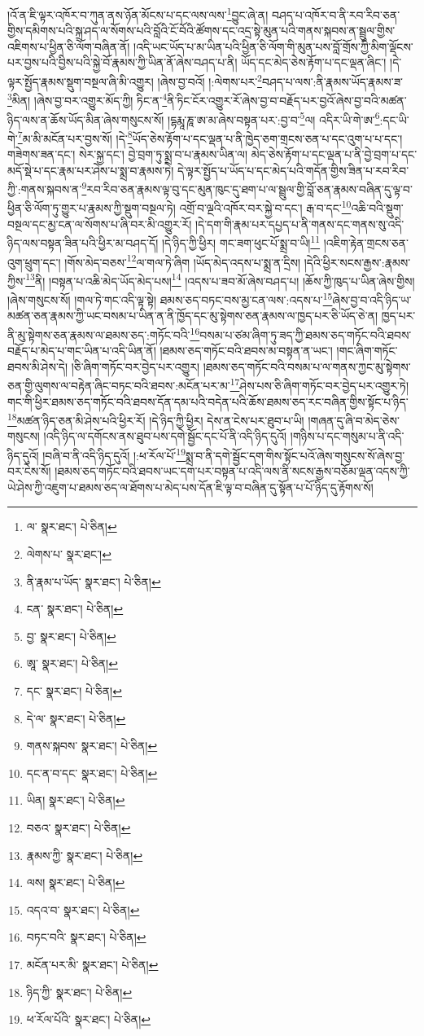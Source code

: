 །འོ་ན་ཇི་ལྟར་འཁོར་བ་ཀུན་ནས་ཉོན་མོངས་པ་དང་ལས་ལས་\footnote{ལ་  སྣར་ཐང་།  པེ་ཅིན། }བྱུང་ཞེ་ན། བཤད་པ་འཁོར་བ་ནི་རབ་རིབ་ཅན་གྱིས་དམིགས་པའི་སྐྲ་ཤད་ལ་སོགས་པའི་བློའི་ངོ་བོའི་ཚོགས་དང་འདྲ་སྟེ་མུན་པའི་གནས་སྐབས་ན་སྦྲུལ་གྱིས་འཇིགས་པ་ཕྱིན་ཅི་ལོག་བཞིན་ནོ། །འདི་ཡང་ཡོད་པ་མ་ཡིན་པའི་ཕྱིན་ཅི་ལོག་གི་མུན་པས་བློ་གྲོས་ཀྱི་མིག་ལྡོངས་པར་བྱས་པའི་བྱིས་པའི་སྐྱེ་བོ་རྣམས་ཀྱི་ཡིན་ནོ་ཞེས་བཤད་པ་ནི། ཡོད་དང་མེད་ཅེས་རྟོག་པ་དང་ལྡན་ཞིང་། །དེ་ལྟར་སྤྱོད་རྣམས་སྡུག་བསྔལ་ཞི་མི་འགྱུར། །ཞེས་བྱ་བའོ། །:ལེགས་པར་\footnote{ལེགས་པ་  སྣར་ཐང་། }བཤད་པ་ལས་:ནི་རྣམས་ཡོད་རྣམས་ཟ་\footnote{ནི་རྣམ་པ་ཡོད་  སྣར་ཐང་།  པེ་ཅིན། }མིན། །ཞེས་བྱ་བར་འགྱུར་མོད་ཀྱི། ཏིང་ན་\footnote{ངན་  སྣར་ཐང་།  པེ་ཅིན། }ནི་ཏིང་ངོར་འགྱུར་རོ་ཞེས་བྱ་བ་བརྗོད་པར་བྱའོ་ཞེས་བྱ་བའི་མཚན་ཉིད་ལས་ན་ཆོས་ཡོད་མིན་ཞེས་གསུངས་སོ། །དྷརྨཱ་ཎཱ་ཨ་མ་ཞེས་བསྟན་པར་:བྱ་བ་\footnote{བྱ་  སྣར་ཐང་།  པེ་ཅིན། }ལ། འདིར་ཡི་གེ་ཨ་\footnote{ཨཱ་  སྣར་ཐང་།  པེ་ཅིན། }:དང་ཡི་གེ་\footnote{དང་  སྣར་ཐང་།  པེ་ཅིན། }མ་མི་མངོན་པར་བྱས་སོ། །དེ་\footnote{དེ་ལ་  སྣར་ཐང་།  པེ་ཅིན། }ཡོད་ཅེས་རྟོག་པ་དང་ལྡན་པ་ནི་ཁྱེད་ཅག་གྲངས་ཅན་པ་དང་འུག་པ་པ་དང་། གཟེགས་ཟན་དང་། སེར་སྐྱ་དང་། བྱེ་བྲག་ཏུ་སྨྲ་བ་པ་རྣམས་ཡིན་ལ། མེད་ཅེས་རྟོག་པ་དང་ལྡན་པ་ནི་བྱེ་བྲག་པ་དང་མདོ་སྡེ་པ་དང་རྣམ་པར་ཤེས་པ་སྨྲ་བ་རྣམས་ཏེ། དེ་ལྟར་སྤྱོད་པ་ཡོད་པ་དང་མེད་པའི་གདོན་གྱིས་ཟིན་པ་རབ་རིབ་ཀྱི་:གནས་སྐབས་ན་\footnote{གནས་སྐབས་  སྣར་ཐང་།  པེ་ཅིན། }རབ་རིབ་ཅན་རྣམས་ལྟ་བུ་དང་མུན་ཁུང་དུ་ཐག་པ་ལ་སྦྲུལ་གྱི་བློ་ཅན་རྣམས་བཞིན་དུ་ལྟ་བ་ཕྱིན་ཅི་ལོག་ཏུ་གྱུར་པ་རྣམས་ཀྱི་སྡུག་བསྔལ་ཏེ། འགྲོ་བ་ལྔའི་འཁོར་བར་སྐྱེ་བ་དང་། རྒ་བ་དང་\footnote{དང་ན་བ་དང་  སྣར་ཐང་།  པེ་ཅིན། }འཆི་བའི་སྡུག་བསྔལ་དང་མྱ་ངན་ལ་སོགས་པ་ཞི་བར་མི་འགྱུར་རོ། །དེ་དག་གི་རྣམ་པར་དཔྱད་པ་ནི་གནས་དང་གནས་སུ་འདི་ཉིད་ལས་བསྟན་ཟིན་པའི་ཕྱིར་མ་བཤད་དོ། །དེ་ཉིད་ཀྱི་ཕྱིར། གང་ཟག་ཕུང་པོ་སྨྲ་བ་ཡི།\footnote{ཡིན།  སྣར་ཐང་།  པེ་ཅིན། } །འཇིག་རྟེན་གྲངས་ཅན་འུག་ཕྲུག་དང་། །གོས་མེད་བཅས་\footnote{བཅའ་  སྣར་ཐང་།  པེ་ཅིན། }ལ་གལ་ཏེ་ཞིག །ཡོད་མེད་འདས་པ་སྨྲ་ན་དྲིས། །དེའི་ཕྱིར་སངས་རྒྱས་:རྣམས་ཀྱིས་\footnote{རྣམས་ཀྱི་  སྣར་ཐང་།  པེ་ཅིན། }ནི། །བསྟན་པ་འཆི་མེད་ཡོད་མེད་པས།\footnote{ལས།  སྣར་ཐང་།  པེ་ཅིན། } །འདས་པ་ཟབ་མོ་ཞེས་བཤད་པ། །ཆོས་ཀྱི་ཁུད་པ་ཡིན་ཞེས་གྱིས། །ཞེས་གསུངས་སོ། །གལ་ཏེ་གང་འདི་ལྟ་སྟེ། ཐམས་ཅད་བཏང་བས་མྱ་ངན་ལས་:འདས་པ་\footnote{འདའ་བ་  སྣར་ཐང་།  པེ་ཅིན། }ཞེས་བྱ་བ་འདི་ཉིད་ཡ་མཚན་ཅན་རྣམས་ཀྱི་ཡང་བསམ་པ་ཡིན་ན་ནི་ཁྱོད་དང་མུ་སྟེགས་ཅན་རྣམས་ལ་ཁྱད་པར་ཅི་ཡོད་ཅེ་ན། ཁྱད་པར་ནི་མུ་སྟེགས་ཅན་རྣམས་ལ་ཐམས་ཅད་:གཏོང་བའི་\footnote{བཏང་བའི་  སྣར་ཐང་།  པེ་ཅིན། }བསམ་པ་ཙམ་ཞིག་ཏུ་ཟད་ཀྱི་ཐམས་ཅད་གཏོང་བའི་ཐབས་བརྗོད་པ་མེད་པ་གང་ཡིན་པ་འདི་ཡིན་ནོ། །ཐམས་ཅད་གཏོང་བའི་ཐབས་མ་བསྟན་ན་ཡང་། །གང་ཞིག་གཏོང་ཐབས་མི་ཤེས་དེ། །ཅི་ཞིག་གཏོང་བར་བྱེད་པར་འགྱུར། །ཐམས་ཅད་གཏོང་བའི་བསམ་པ་ལ་གནས་ཀྱང་མུ་སྟེགས་ཅན་གྱི་ལུགས་ལ་བརྟེན་ཞིང་བཏང་བའི་ཐབས་:མངོན་པར་མ་\footnote{མངོན་པར་མི་  སྣར་ཐང་།  པེ་ཅིན། }ཤེས་པས་ཅི་ཞིག་གཏོང་བར་བྱེད་པར་འགྱུར་ཏེ། གང་གི་ཕྱིར་ཐམས་ཅད་གཏོང་བའི་ཐབས་དོན་དམ་པའི་བདེན་པའི་ཆོས་ཐམས་ཅད་རང་བཞིན་གྱིས་སྟོང་པ་ཉིད་\footnote{ཉིད་ཀྱི་  སྣར་ཐང་།  པེ་ཅིན། }མཚན་ཉིད་ཅན་མི་ཤེས་པའི་ཕྱིར་རོ། །དེ་ཉིད་ཀྱི་ཕྱིར། དེས་ན་ངེས་པར་ཐུབ་པ་ཡི། །གཞན་དུ་ཞི་བ་མེད་ཅེས་གསུངས། །འདི་ཉིད་ལ་དགོངས་ནས་ཐུབ་པས་དགེ་སྦྱོང་དང་པོ་ནི་འདི་ཉིད་དུའོ། །གཉིས་པ་དང་གསུམ་པ་ནི་འདི་ཉིད་དུའོ། །བཞི་བ་ནི་འདི་ཉིད་དུའོ། །:ཕ་རོལ་པོ་\footnote{ཕ་རོལ་པོའི་  སྣར་ཐང་།  པེ་ཅིན། }སྨྲ་བ་ནི་དགེ་སྦྱོང་དག་གིས་སྟོང་པའོ་ཞེས་གསུངས་སོ་ཞེས་བྱ་བར་ངེས་སོ། །ཐམས་ཅད་གཏོང་བའི་ཐབས་ཡང་དག་པར་བསྟན་པ་འདི་ལས་ནི་སངས་རྒྱས་བཅོམ་ལྡན་འདས་ཀྱི་ཡེ་ཤེས་ཀྱི་འཇུག་པ་ཐམས་ཅད་ལ་ཐོགས་པ་མེད་པས་དོན་ཇི་ལྟ་བ་བཞིན་དུ་སྟོན་པ་པོ་ཉིད་དུ་རྟོགས་སོ། 